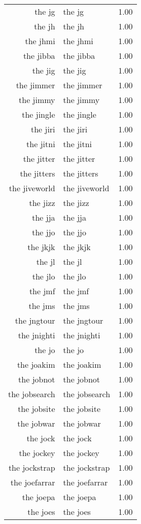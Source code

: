\begin{table}[ht]
\begin{tabular}{rlr}
  the jg & the jg & 1.00 \\ 
  the jh & the jh & 1.00 \\ 
  the jhmi & the jhmi & 1.00 \\ 
  the jibba & the jibba & 1.00 \\ 
  the jig & the jig & 1.00 \\ 
  the jimmer & the jimmer & 1.00 \\ 
  the jimmy & the jimmy & 1.00 \\ 
  the jingle & the jingle & 1.00 \\ 
  the jiri & the jiri & 1.00 \\ 
  the jitni & the jitni & 1.00 \\ 
  the jitter & the jitter & 1.00 \\ 
  the jitters & the jitters & 1.00 \\ 
  the jiveworld & the jiveworld & 1.00 \\ 
  the jizz & the jizz & 1.00 \\ 
  the jja & the jja & 1.00 \\ 
  the jjo & the jjo & 1.00 \\ 
  the jkjk & the jkjk & 1.00 \\ 
  the jl & the jl & 1.00 \\ 
  the jlo & the jlo & 1.00 \\ 
  the jmf & the jmf & 1.00 \\ 
  the jms & the jms & 1.00 \\ 
  the jngtour & the jngtour & 1.00 \\ 
  the jnighti & the jnighti & 1.00 \\ 
  the jo & the jo & 1.00 \\ 
  the joakim & the joakim & 1.00 \\ 
  the jobnot & the jobnot & 1.00 \\ 
  the jobsearch & the jobsearch & 1.00 \\ 
  the jobsite & the jobsite & 1.00 \\ 
  the jobwar & the jobwar & 1.00 \\ 
  the jock & the jock & 1.00 \\ 
  the jockey & the jockey & 1.00 \\ 
  the jockstrap & the jockstrap & 1.00 \\ 
  the joefarrar & the joefarrar & 1.00 \\ 
  the joepa & the joepa & 1.00 \\ 
  the joes & the joes & 1.00 \\ 

\end{tabular}
\end{table}
